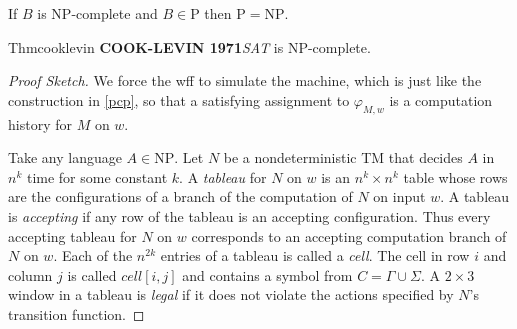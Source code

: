 If $B$ is NP-complete and $B\in \mathrm{P}$ then $\mathrm{P}=\mathrm{NP}$.

\begin{reference}{Thm}{cooklevin}
  \textbf{COOK-LEVIN 1971}\quad\textit{SAT} is NP-complete.
\end{reference}

\begin{proof}[Proof Sketch]
  We force the wff to simulate the machine, which is just like the construction in \ref{pcp}, so that a satisfying assignment to $\varphi_{M,w}$ is a computation history for $M$ on $w$.

  Take any language $A\in \mathrm{NP}$. Let $N$ be a nondeterministic TM that decides $A$ in $n^k$ time for some constant $k$. A \emph{tableau} for $N$ on $w$ is an $n^k\times n^k$ table whose rows are the configurations of a branch of the computation of $N$ on input $w$. A tableau is \emph{accepting} if any row of the tableau is an accepting configuration. Thus every accepting tableau for $N$ on $w$ corresponds to an accepting computation branch of $N$ on $w$. Each of the $n^{2k}$ entries of a tableau is called a \emph{cell}. The cell in row $i$ and column $j$ is called $cell[i,j]$ and contains a symbol from $C=\Gamma\cup \Sigma$. A $2\times 3$ window in a tableau is \emph{legal} if it does not violate the actions specified by $N$’s transition function.


\end{proof}
